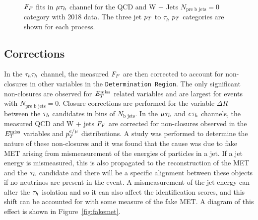 \begin{figure}[!hbtp]
     \\
\caption{$F_{F}$ fits in $\mu\tau_{h}$ channel for the QCD and W + Jets $N_{\text{pre b jets}}=0$ category with 2018 data. The three jet $p_{T}$ to $\tau_h$ $p_{T}$ categories are shown for each process.}
\label{fig:mt_ff_fit}
\end{figure}

\subsection{Corrections}

In the $\tau_{h}\tau_{h}$ channel, the measured $F_{F}$ are then corrected to account for non-closures in other variables in the \texttt{Determination Region}. 
The only significant non-closures are observed for $E_{T}^{\text{miss}}$ related variables and are largest for events with $N_{\text{pre b jets}}=0$. 
Closure corrections are performed for the variable $\Delta R$ between the $\tau_{h}$ candidates in bins of $N_{\text{b jets}}$.
In the $\mu_{}\tau_{h}$ and $e_{}\tau_{h}$ channels, the measured QCD and W + jets $F_{F}$ are corrected for non-closures observed in the $E_{T}^{\text{miss}}$ variables and $p_{T}^{e/\mu}$ distributions.
A study was performed to determine the nature of these non-closures and it was found that the cause was due to fake \ac{MET} arising from mismeasurement of the energies of particles in a jet. 
If a jet energy is mismeasured, this is also propagated to the reconstruction of the \ac{MET} and the $\tau_{h}$ candidate and there will be a specific alignment between these objects if no neutrinos are present in the event.
A mismeasurement of the jet energy can alter the $\tau_{h}$ isolation and so it can also affect the identification scores, and this shift can be accounted for with some measure of the fake \ac{MET}.
A diagram of this effect is shown in Figure~\ref{fig:fakemet}. \\

